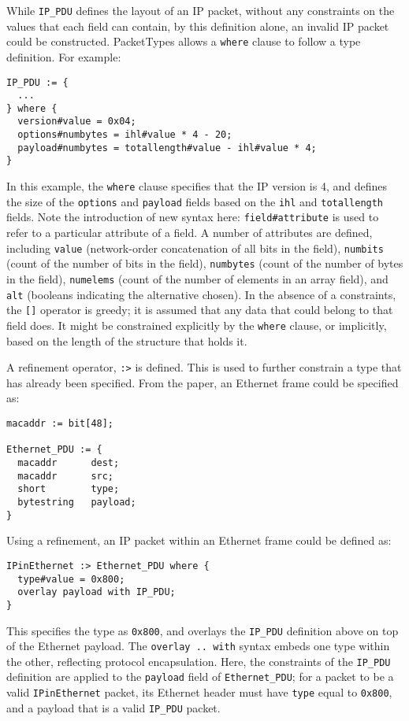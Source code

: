 \documentclass[10pt,a4paper]{article}
\begin{document}
While \texttt{IP\_PDU} defines the layout of an IP packet, without any constraints on the
values that each field can contain, by this definition alone, an invalid IP packet could
be constructed. PacketTypes allows a \texttt{where} clause to follow a type definition.
For example:

\begin{verbatim}
IP_PDU := {
  ...
} where {
  version#value = 0x04;
  options#numbytes = ihl#value * 4 - 20;
  payload#numbytes = totallength#value - ihl#value * 4;
}
\end{verbatim}

In this example, the \texttt{where} clause specifies that the IP version is 4, and defines
the size of the \texttt{options} and \texttt{payload} fields based on the \texttt{ihl}
and \texttt{totallength} fields. Note the introduction of new syntax here:
\texttt{field\#attribute} is used to refer to a particular attribute of a field. A number
of attributes are defined, including \texttt{value} (network-order concatenation of all
bits in the field), \texttt{numbits} (count of the number of bits in the field),
\texttt{numbytes} (count of the number of bytes in the field), \texttt{numelems} (count
of the number of elements in an array field), and \texttt{alt} (booleans indicating the
alternative chosen). In the absence of a constraints, the \texttt{[]} operator is greedy;
it is assumed that any data that could belong to that field does. It might be constrained
explicitly by the \texttt{where} clause, or implicitly, based on the length of the
structure that holds it.

A refinement operator, \texttt{:>} is defined. This is used to further constrain a type
that has already been specified. From the paper, an Ethernet frame could be specified as:

\begin{verbatim}
macaddr := bit[48];

Ethernet_PDU := {
  macaddr      dest;
  macaddr      src;
  short        type;
  bytestring   payload;
}
\end{verbatim}

Using a refinement, an IP packet within an Ethernet frame could be defined as:

\begin{verbatim}
IPinEthernet :> Ethernet_PDU where {
  type#value = 0x800;
  overlay payload with IP_PDU;
}
\end{verbatim}

This specifies the type as \texttt{0x800}, and overlays the \texttt{IP\_PDU} definition
above on top of the Ethernet payload. The \texttt{overlay .. with} syntax embeds one type
within the other, reflecting protocol encapsulation. Here, the constraints of the
\texttt{IP\_PDU} definition are applied to the \texttt{payload} field of
\texttt{Ethernet\_PDU}; for a packet to be a valid \texttt{IPinEthernet} packet, its
Ethernet header must have \texttt{type} equal to \texttt{0x800}, and a payload that is a
valid \texttt{IP\_PDU} packet.
\end{document}
